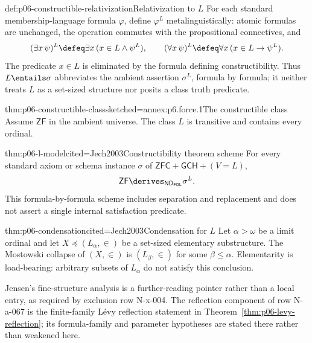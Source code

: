 \begin{hbconvention}{def:p06-constructible-relativization}{Relativization to \(L\)}
For each standard membership-language formula \(\varphi\), define
\(\varphi^L\) metalinguistically: atomic formulas are unchanged, the
operation commutes with the propositional connectives, and
\[
  (\exists x\,\psi)^L\defeq
    \exists x\,(x\in L\land\psi^L),
  \qquad
  (\forall x\,\psi)^L\defeq
    \forall x\,(x\in L\to\psi^L).
\]
The predicate \(x\in L\) is eliminated by the formula defining
constructibility.  Thus \(L\entails\sigma\) abbreviates the ambient assertion
\(\sigma^L\), formula by formula; it neither treats \(L\) as a set-sized
structure nor posits a class truth predicate.
\end{hbconvention}

\begin{hbtheorem}{thm:p06-constructible-class}{sketched=annex:p6.force.1}{The constructible class}
Assume \(\mathsf{ZF}\) in the ambient universe.  The class \(L\) is transitive
and contains every ordinal.
\end{hbtheorem}

\begin{hbtheorem}{thm:p06-l-model}{cited=Jech2003}{Constructibility theorem scheme}
For every standard axiom or schema instance \(\sigma\) of
\(\mathsf{ZFC}+\mathsf{GCH}+(V=L)\),
\[
  \mathsf{ZF}\derives_{\mathsf{ND}_{\mathsf{FOL}}}\sigma^L.
\]
This formula-by-formula scheme includes separation and replacement and does
not assert a single internal satisfaction predicate.
\end{hbtheorem}

\begin{hbtheorem}{thm:p06-condensation}{cited=Jech2003}{Condensation for \(L\)}
Let \(\alpha>\omega\) be a limit ordinal and let
  \(X\preccurlyeq(L_\alpha,\in)\) be a set-sized elementary substructure.  The
Mostowski collapse of \((X,\in)\) is \((L_\beta,\in)\) for some
\(\beta\leq\alpha\).  Elementarity is load-bearing: arbitrary subsets of
\(L_\alpha\) do not satisfy this conclusion.
\end{hbtheorem}

Jensen's fine-structure analysis is a further-reading pointer rather than a
local entry, as required by exclusion row N-x-004.  The reflection component
of row N-a-067 is the finite-family L\'evy reflection statement in
Theorem~\ref{thm:p06-levy-reflection}; its formula-family and parameter
hypotheses are stated there rather than weakened here.

